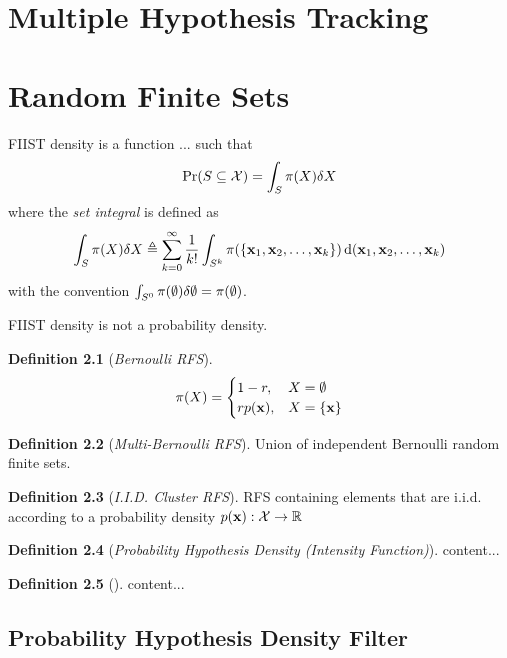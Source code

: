 \documentclass[a4paper]{scrreprt}
\theoremstyle{theorem}
\theoremstyle{definition}
\newtheorem{defn}{Definition}
\begin{document}
\chapter{Multiple Hypothesis Tracking}\label{ch:multiple_hypothesis_tracking}




\chapter{Random Finite Sets}\label{ch:random_finite_sets}

FIIST density is a function ... such that 
\begin{equation}\label{eq:fiist_density}
	\mathrm{Pr}(S \subseteq \mathcal{X}) = \int_S \pi(X) \dsx[X]
\end{equation}
where the \emph{set integral} is defined as
\begin{equation}\label{eq:set_integral}
	\int_S \pi(X) \dsx[X] \triangleq \sum_{k=0}^{\infty}\frac{1}{k!}\int_{S^k} \pi(\Bqty{\inVar_1, \inVar_2, \ldots, \inVar_k}) \dx[(\inVar_1, \inVar_2, \ldots, \inVar_k)]
\end{equation}
with the convention \( \int_{S^0} \pi(\emptyset) \dsx[\emptyset] = \pi(\emptyset) \).

FIIST density is not a probability density.

\begin{defn}[\emph{Bernoulli RFS}]
\begin{equation}\label{eq:bernoulli_rfs}
	\pi(X) = 
	\begin{cases}
	1 - r, 			& X = \emptyset \\
	r p(\stVar), 	& X = \Bqty{\stVar}
	\end{cases}
\end{equation}
\end{defn}

\begin{defn}[\emph{Multi-Bernoulli RFS}]
	Union of independent Bernoulli random finite sets.
\end{defn}

\begin{defn}[\emph{I.I.D. Cluster RFS}]
	RFS containing elements that are i.i.d. according to a probability density \( p(\stVar): \stSp\to\R \)
\end{defn}

\begin{defn}[\emph{Probability Hypothesis Density (Intensity Function)}]
	content...
\end{defn}

\begin{defn}[]
	content...
\end{defn}



\section{Probability Hypothesis Density Filter}
\end{document}
